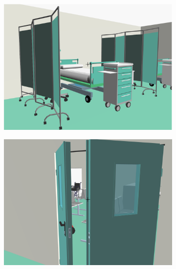 \documentclass[]{egpubl}
\begin{document}
\begin{figure}[htbp]
\begin{subfigure}[b]{0.165\textwidth}
   \includegraphics[width=\textwidth]{images/emergency/6}
   \end{subfigure}
 \hspace{-1.5mm}   
   \begin{subfigure}[b]{0.165\textwidth}
   \includegraphics[width=\textwidth]{images/emergency/7}
   \end{subfigure}


\end{figure}
\end{document}
